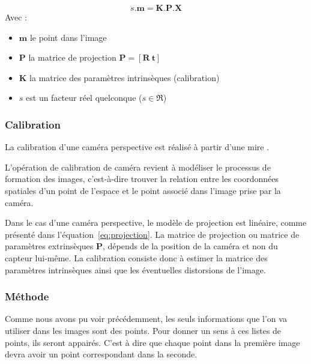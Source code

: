 \begin{equation}
s.\mathbf{m} = \mathbf{K}.\mathbf{P}.\mathbf{X}
\end{equation}
Avec : 
\begin{itemize}
\item $\mathbf{m}$ le point dans l'image
\item $\mathbf{P}$ la matrice de projection 
$\mathbf{P} = [ \mathbf{R} ~ \mathbf{t} ]$
\item $\mathbf{K}$ la matrice des paramètres intrinsèques (calibration)
\item $s$ est un facteur réel quelconque ($s \in \Re$)
\end{itemize}

\subsubsection{Calibration}
\label{subsub:calibration}
La calibration d'une caméra perspective est réalisé à partir d'une mire \cite{HoraudBook, Hartley03Book}.

L'opération de calibration de caméra revient à modéliser le processus de formation des images, c'est-à-dire trouver la relation entre les coordonnées spatiales d'un point de l'espace et le point associé dans l'image prise par la caméra.

Dans le cas d'une caméra perspective, le modèle de projection est linéaire, comme présenté dans l'équation~\ref{eq:projection}.
La matrice de projection ou matrice de paramètres extrinsèques $\mathbf{P}$, dépends de la position de la caméra et non du capteur lui-même.
La calibration consiste donc à estimer la matrice des paramètres intrinsèques ainsi que les éventuelles distorsions de l'image.


\subsubsection{Méthode}
\label{subsub:reconstruction}

Comme nous avons pu voir précédemment, les seuls informations que l'on va utiliser dans les images sont des points.
Pour donner un sens à ces listes de points, ils seront appairés.
C'est à dire que chaque point dans la première image devra avoir un point correspondant dans la seconde.

